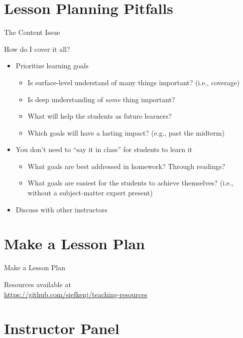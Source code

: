 \documentclass[10pt, aspectratio=169, t]{beamer}
\begin{document}
\section{Lesson Planning Pitfalls}
\begin{frame}{The Content Issue}

	\begin{center}
	{\Large How do I cover it all?}
	\end{center}

	\pause
	\begin{itemize}
		\item \textcolor{mLightGreen}{Prioritize learning goals}
			\begin{itemize}
				\item Is surface-level understand of many things important? (i.e., coverage)
				\item Is deep understanding of \emph{some} thing important?
				\item What will help the students as future learners?
				\item Which goals will have a lasting impact? (e.g., past the midterm)
			\end{itemize}
		\item \textcolor{mLightGreen}{You don't need to ``say it in class'' for students to learn it}
			\begin{itemize}
				\item What goals are best addressed in homework? Through readings?
				\item What goals are easiest for the students to achieve themselves? (i.e.,
					without a subject-matter expert present)
			\end{itemize}
		\item \textcolor{mLightGreen}{Discuss with other instructors}
			
	\end{itemize}
\end{frame}

\section{Make a Lesson Plan}
\begin{frame}{Make a Lesson Plan}

	Resources available at\\ \url{https://github.com/siefkenj/teaching-resources}
	\begin{center}
	\end{center}
\end{frame}

\section{Instructor Panel}
\end{document}
